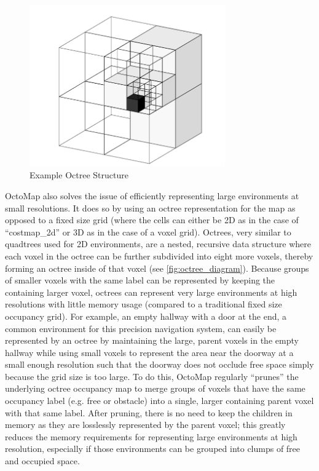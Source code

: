 \begin{figure}
\centering
\includegraphics[width=0.75\textwidth]{images/octree_diagram}
\caption[Example Octree Structure]{Example Octree Structure \autocite{octomap} \label{fig:octree_diagram}}
\end{figure}

OctoMap also solves the issue of efficiently representing large environments at small resolutions. It does so by using an octree representation for the map as opposed to a fixed size grid (where the cells can either be 2D as in the case of ``costmap\_2d'' or 3D as in the case of a voxel grid). Octrees, very similar to quadtrees used for 2D environments, are a nested, recursive data structure where each voxel in the octree can be further subdivided into eight more voxels, thereby forming an octree inside of that voxel (see \autoref{fig:octree_diagram}). Because groups of smaller voxels with the same label can be represented by keeping the containing larger voxel, octrees can represent very large environments at high resolutions with little memory usage (compared to a traditional fixed size occupancy grid). For example, an empty hallway with a door at the end, a common environment for this precision navigation system, can easily be represented by an octree by maintaining the large, parent voxels in the empty hallway while using small voxels to represent the area near the doorway at a small enough resolution such that the doorway does not occlude free space simply because the grid size is too large. To do this, OctoMap regularly ``prunes'' the underlying octree occupancy map to merge groups of voxels that have the same occupancy label (e.g. free or obstacle) into a single, larger containing parent voxel with that same label. After pruning, there is no need to keep the children in memory as they are losslessly represented by the parent voxel; this greatly reduces the memory requirements for representing large environments at high resolution, especially if those environments can be grouped into clumps of free and occupied space.

